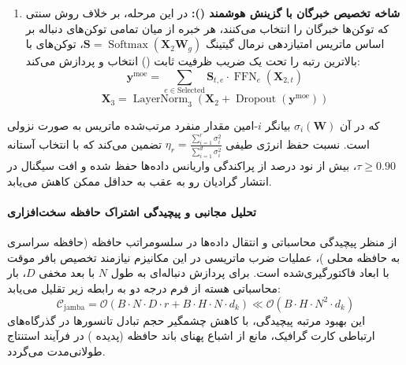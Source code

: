 \begin{enumerate}
    \item \textbf{شاخه تخصیص خبرگان با گزینش هوشمند ():}
    در این مرحله، بر خلاف روش سنتی که توکن‌ها خبرگان را انتخاب می‌کنند، هر خبره از میان تمامی توکن‌های دنباله بر اساس ماتریس امتیازدهی نرمال گیتینگ $\mathbf{S} = \operatorname{Softmax}(\mathbf{X}_2 \mathbf{W}_g)$، توکن‌های با بالاترین رتبه را تحت یک ضریب ظرفیت ثابت () انتخاب و پردازش می‌کند:
    \begin{equation}
    \mathbf{y}^{\text{moe}} = \sum_{e \in \text{Selected}} \mathbf{S}_{t, e} \cdot \operatorname{FFN}_e(\mathbf{X}_{2, t})
    \end{equation}
    \begin{equation}
    \mathbf{X}_3 = \operatorname{LayerNorm}_3\left(\mathbf{X}_2 + \operatorname{Dropout}\left(\mathbf{y}^{\text{moe}}\right)\right)
    \end{equation}
\end{enumerate}

که در آن $\sigma_i(\mathbf{W})$ بیانگر $i$-امین مقدار منفرد مرتب‌شده ماتریس به صورت نزولی است. نسبت حفظ انرژی طیفی $\eta_r = \frac{\sum_{i=1}^r \sigma_i^2}{\sum_{i=1}^{d} \sigma_i^2}$ تضمین می‌کند که با انتخاب آستانه $\tau \ge 0.90$، بیش از نود درصد از پراکندگی واریانس داده‌ها حفظ شده و افت سیگنال در انتشار گرادیان رو به عقب به حداقل ممکن کاهش می‌یابد.

\paragraph{تحلیل مجانبی و پیچیدگی اشتراک حافظه سخت‌افزاری}
از منظر پیچیدگی محاسباتی و انتقال داده‌ها در سلسومراتب حافظه (حافظه سراسری  به حافظه محلی )، عملیات ضرب ماتریسی در این مکانیزم نیازمند تخصیص بافر موقت با ابعاد فاکتورگیری‌شده است. برای پردازش دنباله‌ای به طول $N$ با بعد مخفی $D$، بار محاسباتی هسته از فرم درجه دو به رابطه زیر تقلیل می‌یابد:
\begin{equation}
\label{eq:complexity_jamba}
\mathcal{C}_{\text{jamba}} = \mathcal{O}\left( B \cdot N \cdot D \cdot r + B \cdot H \cdot N \cdot d_k \right) \ll \mathcal{O}\left( B \cdot H \cdot N^2 \cdot d_k \right)
\end{equation}
این بهبود مرتبه پیچیدگی، با کاهش چشمگیر حجم تبادل تانسورها در گذرگاه‌های ارتباطی کارت گرافیک، مانع از اشباع پهنای باند حافظه (پدیده ) در فرآیند استنتاج طولانی‌مدت می‌گردد.
